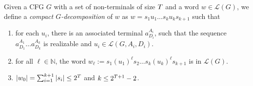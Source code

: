 \documentclass{CSML}
\newcommand{\N}{\mathbb{N}}
\newcommand{\lang}{\mathcal{L}}
\begin{document}
\smallskip{}
Given a CFG $G$ with a set of non-terminals of size $T$ and a word $w \in \lang(G)$, we define 
a \emph{compact $G$-decomposition} of $w$ as  
$w=s_1 u_1 \ldots s_k u_k s_{k+1}$
 such that
\begin{enumerate}
\item for each $u_i$, there is an associated terminal $a_{D_i}^{A_i}$, such that the sequence $a_{D_1}^{A_1} \ldots a_{D_k}^{A_k}$ is realizable and $u_i\in \lang(G,A_i,D_i)$.
\item for all $\ell \in \N$, the word $w_\ell:=s_1 (u_1)^{\ell} s_2 \ldots s_k (u_k)^{\ell} s_{k+1}$ is in $\lang(G)$. 
\item $|w_0|=\sum_{i=1}^{k+1} |s_i| \leq 2^{T}$ and $k \leq 2^{T+1}-2$.
\end{enumerate}
\end{document}
